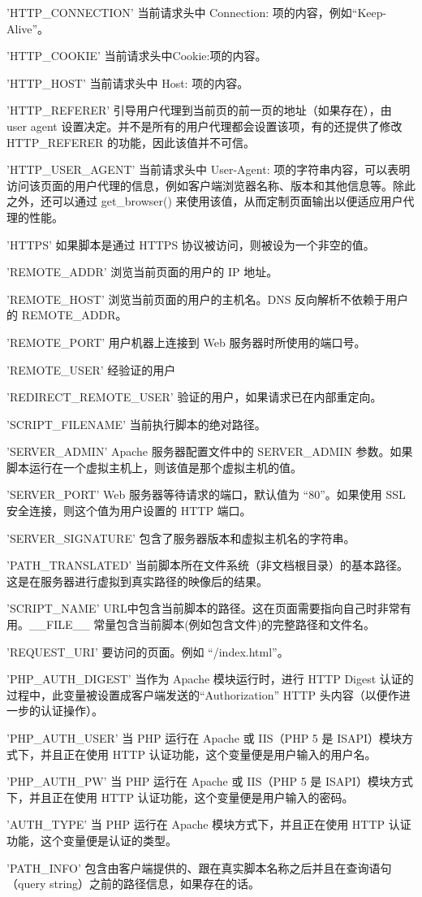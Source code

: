 \begin{compactitem}
\item 'HTTP\_CONNECTION'
当前请求头中 Connection: 项的内容，例如“Keep-Alive”。
\item 'HTTP\_COOKIE'
当前请求头中Cookie:项的内容。
\item 'HTTP\_HOST'
当前请求头中 Host: 项的内容。
\item 'HTTP\_REFERER'
引导用户代理到当前页的前一页的地址（如果存在），由 user agent 设置决定。并不是所有的用户代理都会设置该项，有的还提供了修改 HTTP\_REFERER 的功能，因此该值并不可信。
\item 'HTTP\_USER\_AGENT'
当前请求头中 User-Agent: 项的字符串内容，可以表明访问该页面的用户代理的信息，例如客户端浏览器名称、版本和其他信息等。除此之外，还可以通过 get\_browser() 来使用该值，从而定制页面输出以便适应用户代理的性能。
\item 'HTTPS'
如果脚本是通过 HTTPS 协议被访问，则被设为一个非空的值。
\item 'REMOTE\_ADDR'
浏览当前页面的用户的 IP 地址。
\item 'REMOTE\_HOST'
浏览当前页面的用户的主机名。DNS 反向解析不依赖于用户的 REMOTE\_ADDR。
\item 'REMOTE\_PORT'
用户机器上连接到 Web 服务器时所使用的端口号。
\item 'REMOTE\_USER'
经验证的用户
\item 'REDIRECT\_REMOTE\_USER'
验证的用户，如果请求已在内部重定向。
\item 'SCRIPT\_FILENAME'
当前执行脚本的绝对路径。
\item 'SERVER\_ADMIN'
Apache 服务器配置文件中的 SERVER\_ADMIN 参数。如果脚本运行在一个虚拟主机上，则该值是那个虚拟主机的值。
\item 'SERVER\_PORT'
Web 服务器等待请求的端口，默认值为 “80”。如果使用 SSL 安全连接，则这个值为用户设置的 HTTP 端口。
\item 'SERVER\_SIGNATURE'
包含了服务器版本和虚拟主机名的字符串。
\item 'PATH\_TRANSLATED'
当前脚本所在文件系统（非文档根目录）的基本路径。这是在服务器进行虚拟到真实路径的映像后的结果。
\item 'SCRIPT\_NAME'
URL中包含当前脚本的路径。这在页面需要指向自己时非常有用。\_\_FILE\_\_ 常量包含当前脚本(例如包含文件)的完整路径和文件名。
\item 'REQUEST\_URI'
要访问的页面。例如 “/index.html”。
\item 'PHP\_AUTH\_DIGEST'
当作为 Apache 模块运行时，进行 HTTP Digest 认证的过程中，此变量被设置成客户端发送的“Authorization” HTTP 头内容（以便作进一步的认证操作）。
\item 'PHP\_AUTH\_USER'
当 PHP 运行在 Apache 或 IIS（PHP 5 是 ISAPI）模块方式下，并且正在使用 HTTP 认证功能，这个变量便是用户输入的用户名。
\item 'PHP\_AUTH\_PW'
当 PHP 运行在 Apache 或 IIS（PHP 5 是 ISAPI）模块方式下，并且正在使用 HTTP 认证功能，这个变量便是用户输入的密码。
\item 'AUTH\_TYPE'
当 PHP 运行在 Apache 模块方式下，并且正在使用 HTTP 认证功能，这个变量便是认证的类型。
\item 'PATH\_INFO'
包含由客户端提供的、跟在真实脚本名称之后并且在查询语句（query string）之前的路径信息，如果存在的话。


\end{compactitem}
